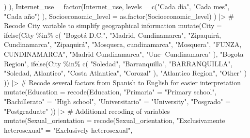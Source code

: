 \documentclass[
  bookmarksnumbered]{article}
\newenvironment{Shaded}{\begin{snugshade}}{\end{snugshade}}
\newcommand{\AttributeTok}[1]{\textcolor[rgb]{0.80,0.80,0.80}{#1}}
\newcommand{\CommentTok}[1]{\textcolor[rgb]{0.50,0.62,0.50}{#1}}
\newcommand{\FunctionTok}[1]{\textcolor[rgb]{0.94,0.94,0.56}{#1}}
\newcommand{\NormalTok}[1]{\textcolor[rgb]{0.80,0.80,0.80}{#1}}
\newcommand{\OtherTok}[1]{\textcolor[rgb]{0.94,0.94,0.56}{#1}}
\newcommand{\SpecialCharTok}[1]{\textcolor[rgb]{0.86,0.64,0.64}{#1}}
\newcommand{\StringTok}[1]{\textcolor[rgb]{0.80,0.58,0.58}{#1}}
\begin{document}
\begin{Shaded}
\begin{Highlighting}[]
\NormalTok{                                 )}
\NormalTok{    ),}
    \AttributeTok{Internet\_use =} \FunctionTok{factor}\NormalTok{(Internet\_use,}
                          \AttributeTok{levels =} \FunctionTok{c}\NormalTok{(}\StringTok{"Cada día"}\NormalTok{, }\StringTok{"Cada mes"}\NormalTok{, }\StringTok{"Cada año"}\NormalTok{)}
\NormalTok{    ),}
    \AttributeTok{Socioeconomic\_level =} \FunctionTok{as.factor}\NormalTok{(Socioeconomic\_level)}
\NormalTok{  ) }\SpecialCharTok{|\textgreater{}}
  \CommentTok{\# Recode City variable to simplify geographical information}
  \FunctionTok{mutate}\NormalTok{(}\AttributeTok{City =} \FunctionTok{ifelse}\NormalTok{(City }\SpecialCharTok{\%in\%} \FunctionTok{c}\NormalTok{(}
    \StringTok{"Bogotá D.C."}\NormalTok{, }\StringTok{"Madrid, Cundinamarca"}\NormalTok{, }\StringTok{"Zipaquirá, Cundinamarca"}\NormalTok{,}
    \StringTok{"Zipaquirá"}\NormalTok{, }\StringTok{"Mosquera, cundinamarca"}\NormalTok{, }\StringTok{"Mosquera"}\NormalTok{,}
    \StringTok{"FUNZA, CUNDINAMARCA"}\NormalTok{, }\StringTok{"Madrid Cundinamarca"}\NormalTok{, }\StringTok{"Une{-} Cundinamarca"}
\NormalTok{  ),}
  \StringTok{"Bogota Region"}\NormalTok{,}
  \FunctionTok{ifelse}\NormalTok{(City }\SpecialCharTok{\%in\%} \FunctionTok{c}\NormalTok{(}
    \StringTok{"Soledad"}\NormalTok{, }\StringTok{"Barranquilla"}\NormalTok{, }\StringTok{"BARRANQUILLA"}\NormalTok{,}
    \StringTok{"Soledad, Atlantico"}\NormalTok{, }\StringTok{"Costa Atlantica"}\NormalTok{, }\StringTok{"Corozal"}
\NormalTok{  ),}
  \StringTok{"Atlantico Region"}\NormalTok{,}
  \StringTok{"Other"}
\NormalTok{  )}
\NormalTok{  )) }\SpecialCharTok{|\textgreater{}}
  \CommentTok{\# Recode several factors from Spanish to English for easier interpretation}
  \FunctionTok{mutate}\NormalTok{(}\AttributeTok{Education =} \FunctionTok{recode}\NormalTok{(Education,}
                            \StringTok{"Primaria"} \OtherTok{=} \StringTok{"Primary school"}\NormalTok{,}
                            \StringTok{"Bachillerato"} \OtherTok{=} \StringTok{"High school"}\NormalTok{,}
                            \StringTok{"Universitario"} \OtherTok{=} \StringTok{"University"}\NormalTok{,}
                            \StringTok{"Posgrado"} \OtherTok{=} \StringTok{"Postgraduate"}
\NormalTok{  )) }\SpecialCharTok{|\textgreater{}}
  \CommentTok{\# Additional recoding of variables}
  \FunctionTok{mutate}\NormalTok{(}\AttributeTok{Sexual\_orientation =} \FunctionTok{recode}\NormalTok{(Sexual\_orientation,}
                                     \StringTok{"Exclusivamente heterosexual"} \OtherTok{=}
                                       \StringTok{"Exclusively heterosexual"}\NormalTok{,}

\end{Highlighting}
\end{Shaded}
\end{document}
